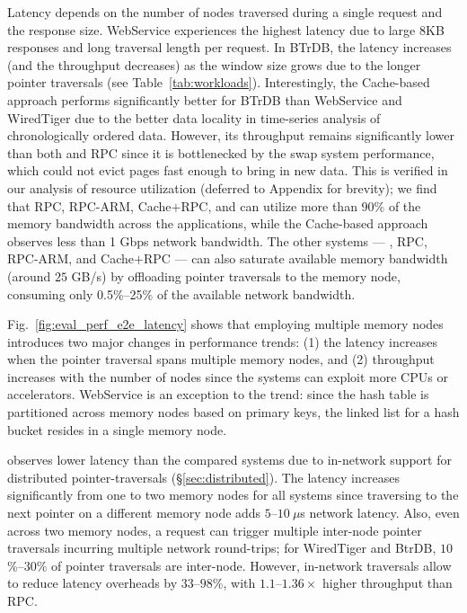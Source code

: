 Latency depends on the number of nodes traversed during a single request and the response size. WebService experiences the highest latency due to large 8KB responses and long traversal length per request. In BTrDB, the latency increases (and the throughput decreases) as the window size grows due to the longer pointer traversals (see Table~\ref{tab:workloads}). Interestingly, the Cache-based approach performs significantly better for BTrDB than WebService and WiredTiger due to the better data locality in time-series analysis of chronologically ordered data. However, its throughput remains significantly lower than both \name and RPC since it is bottlenecked by the swap system performance, which could not evict pages fast enough to bring in new data. This is verified in our analysis of resource utilization (deferred to Appendix for brevity); we find that RPC, RPC-ARM, Cache$+$RPC, and \name can utilize more than 90\% of the memory bandwidth across the applications, while the Cache-based approach observes less than 1 Gbps network bandwidth. The other systems --- \name, RPC, RPC-ARM, and Cache$+$RPC --- can also saturate available memory bandwidth (around $25$ GB/s) by offloading pointer traversals to the memory node, consuming only 0.5\%--25\% of the available network bandwidth. 

 Fig.~\ref{fig:eval_perf_e2e_latency} shows that employing multiple memory nodes introduces two major changes in performance trends: (1) the latency increases when the pointer traversal spans multiple memory nodes, and (2) throughput increases with the number of nodes since the systems can exploit more CPUs or accelerators. WebService is an exception to the trend: since the hash table is partitioned across memory nodes based on primary keys, the linked list for a hash bucket resides in a single memory node. 

\name observes lower latency than the compared systems due to in-network support for distributed pointer-traversals (\S\ref{sec:distributed}). The latency increases significantly from one to two memory nodes for all systems since traversing to the next pointer on a different memory node adds $5$--$10~\mu$s network latency. Also, even across two memory nodes, a request can trigger multiple inter-node pointer traversals incurring multiple network round-trips; for WiredTiger and BtrDB, $10$\%--$30$\% of pointer traversals are inter-node. However, in-network traversals allow \name to reduce latency overheads by $33$--$98$\%, with $1.1$--$1.36\times$ higher throughput than RPC.



